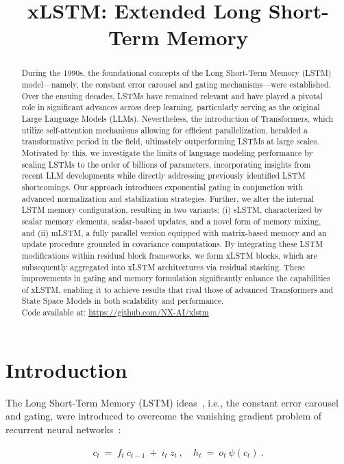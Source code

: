\title{xLSTM: Extended Long Short-Term Memory}

\begin{abstract}
During the 1990s, the foundational concepts of the Long Short-Term Memory (LSTM) model—namely, the constant error carousel and gating mechanisms—were established. Over the ensuing decades, LSTMs have remained relevant and have played a pivotal role in significant advances across deep learning, particularly serving as the original Large Language Models (LLMs). Nevertheless, the introduction of Transformers, which utilize self-attention mechanisms allowing for efficient parallelization, heralded a transformative period in the field, ultimately outperforming LSTMs at large scales. Motivated by this, we investigate the limits of language modeling performance by scaling LSTMs to the order of billions of parameters, incorporating insights from recent LLM developments while directly addressing previously identified LSTM shortcomings. Our approach introduces exponential gating in conjunction with advanced normalization and stabilization strategies. Further, we alter the internal LSTM memory configuration, resulting in two variants: (i) sLSTM, characterized by scalar memory elements, scalar-based updates, and a novel form of memory mixing, and (ii) mLSTM, a fully parallel version equipped with matrix-based memory and an update procedure grounded in covariance computations. By integrating these LSTM modifications within residual block frameworks, we form xLSTM blocks, which are subsequently aggregated into xLSTM architectures via residual stacking. These improvements in gating and memory formulation significantly enhance the capabilities of xLSTM, enabling it to achieve results that rival those of advanced Transformers and State Space Models in both scalability and performance.\\
Code available at: \url{https://github.com/NX-AI/xlstm}
\end{abstract}

\section{Introduction}
\label{sec:intro}

The Long Short-Term Memory (LSTM) ideas~\citep{Hochreiter:91,Hochreiter:97nips,Hochreiter:97}, i.e., the constant error carousel and gating, were introduced to overcome the vanishing gradient problem of recurrent neural networks~\citep{Hochreiter:91,Hochreiter:00book}:

\begin{align}
\label{eq:lstm_idea}
  c_t \ = \ f_t \ c_{t-1} \ + \ 
          i_t \  z_t \ , \quad  
          h_t \ = \ o_t \ \psi({c_t}) \ . 
\end{align}

